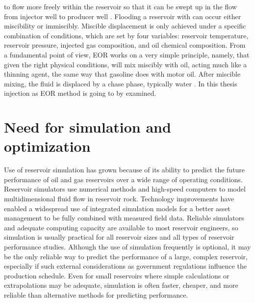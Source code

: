 \begin{description}[style=nextline]
to flow more freely within the reservoir so that it can be swept up in the 
flow from injector well to producer well \citep{Melzer}. Flooding a 
reservoir with  can occur either miscibility or immiscibly. Miscible  
displacement is only achieved under a specific combination of conditions, which 
are set by four variables: reservoir temperature, reservoir pressure, injected 
gas composition, and oil chemical composition. From a fundamental point of view, 
 EOR works on a very simple principle, namely, that given the right physical 
conditions,  will mix miscibly with oil, acting much like a thinning agent, 
the same way that gasoline does with motor oil. After miscible mixing, the fluid 
is displaced by a chase phase, typically water \citep{Meyer}. 
In this thesis  injection as EOR method is going to by examined.
\end{description}
\section {Need for simulation and optimization}
Use of reservoir simulation has grown because of its ability to predict the 
future performance of oil and gas reservoirs over a wide range of operating 
conditions. Reservoir simulators use numerical methods and high-speed computers 
to model multidimensional fluid flow in reservoir rock. Technology improvements have enabled 
a widespread use of integrated simulation models for a better asset management 
to be fully combined with measured field data. Reliable simulators and 
adequate computing capacity are available to most reservoir engineers, so 
simulation is usually practical for all reservoir sizes and all types of 
reservoir performance studies. Although the use of simulation frequently is 
optional, it may be the only reliable way to predict the performance of a large, 
complex reservoir, especially if such external considerations as government 
regulations influence the production schedule. Even for small reservoirs where 
simple calculations or extrapolations may be adequate, simulation is often 
faster, cheaper, and more reliable than alternative methods for predicting 
performance.\citep{Mattax}

